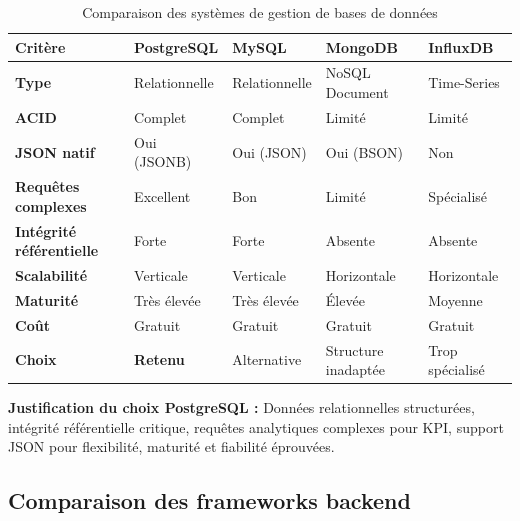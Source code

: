 \begin{table}[htbp]
\centering
\small
\caption{Comparaison des systèmes de gestion de bases de données}
\label{tab:database_comparison}
\begin{tabular}{|p{2.8cm}|p{2.5cm}|p{2.5cm}|p{2.5cm}|p{2.5cm}|}
\hline
\rowcolor{sewesblu!20}
\textbf{Critère} & \textbf{PostgreSQL} & \textbf{MySQL} & \textbf{MongoDB} & \textbf{InfluxDB} \\
\hline
\textbf{Type} & Relationnelle & Relationnelle & NoSQL Document & Time-Series \\
\hline
\textbf{ACID} & Complet & Complet & Limité & Limité \\
\hline
\textbf{JSON natif} & Oui (JSONB) & Oui (JSON) & Oui (BSON) & Non \\
\hline
\textbf{Requêtes complexes} & Excellent & Bon & Limité & Spécialisé \\
\hline
\textbf{Intégrité référentielle} & Forte & Forte & Absente & Absente \\
\hline
\textbf{Scalabilité} & Verticale & Verticale & Horizontale & Horizontale \\
\hline
\textbf{Maturité} & Très élevée & Très élevée & Élevée & Moyenne \\
\hline
\textbf{Coût} & Gratuit & Gratuit & Gratuit & Gratuit \\
\hline
\rowcolor{green!10}
\textbf{Choix} & \textbf{Retenu} & Alternative & Structure inadaptée & Trop spécialisé \\
\hline
\end{tabular}
\end{table}

\textbf{Justification du choix PostgreSQL :} Données relationnelles structurées, intégrité référentielle critique, requêtes analytiques complexes pour KPI, support JSON pour flexibilité, maturité et fiabilité éprouvées.


\subsection{Comparaison des frameworks backend}

